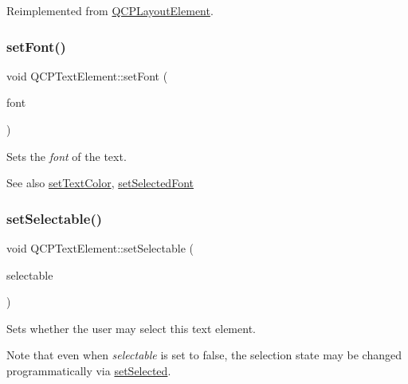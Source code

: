 Reimplemented from \hyperlink{class_q_c_p_layout_element_ae97f483cccedadbf18ea4525ef240ee4}{Q\+C\+P\+Layout\+Element}.

\mbox{\label{class_q_c_p_text_element_a09b3241769528fa87cb4bf35c97defad}} 
\subsubsection{\texorpdfstring{set\+Font()}{setFont()}}
{\footnotesize\ttfamily void Q\+C\+P\+Text\+Element\+::set\+Font (\begin{DoxyParamCaption}\item[{const Q\+Font \&}]{font }\end{DoxyParamCaption})}

Sets the {\itshape font} of the text.

\begin{DoxySeeAlso}{See also}
\hyperlink{class_q_c_p_text_element_a4f3b8361c3ffb3f84346954929ce93ba}{set\+Text\+Color}, \hyperlink{class_q_c_p_text_element_a0a2397a3c4ede519e16ab3e991904065}{set\+Selected\+Font} 
\end{DoxySeeAlso}
\mbox{\label{class_q_c_p_text_element_a3c5f9b1897a036b16495ed3fb8371c55}} 
\subsubsection{\texorpdfstring{set\+Selectable()}{setSelectable()}}
{\footnotesize\ttfamily void Q\+C\+P\+Text\+Element\+::set\+Selectable (\begin{DoxyParamCaption}\item[{bool}]{selectable }\end{DoxyParamCaption})}

Sets whether the user may select this text element.

Note that even when {\itshape selectable} is set to {\ttfamily false}, the selection state may be changed programmatically via \hyperlink{class_q_c_p_text_element_aba5521f9fb22a5f3d2f09ab37d4a1751}{set\+Selected}. \mbox{\label{class_q_c_p_text_element_aba5521f9fb22a5f3d2f09ab37d4a1751}} 
